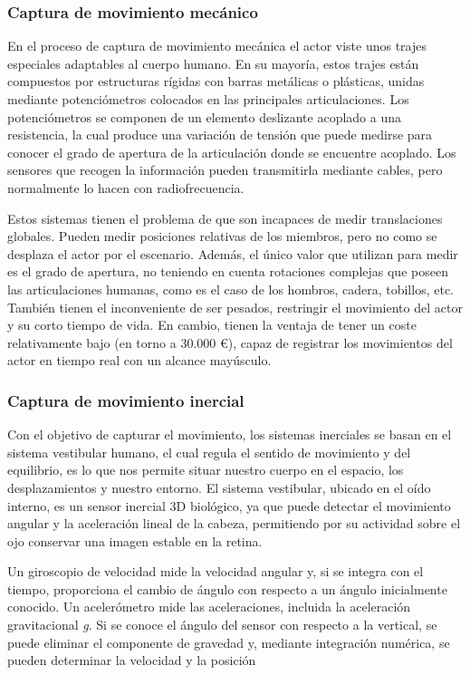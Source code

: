 \subsubsection{Captura de movimiento mecánico}

En el proceso de captura de movimiento mecánica el actor viste unos trajes especiales adaptables al cuerpo humano. En su mayoría, estos trajes están compuestos por estructuras rígidas con barras metálicas o plásticas, unidas mediante potenciómetros colocados en las principales articulaciones. Los potenciómetros se componen de un elemento deslizante acoplado a una resistencia, la cual produce una variación de tensión que puede medirse para conocer el grado de apertura de la articulación donde se encuentre acoplado. Los sensores que recogen la información pueden transmitirla mediante cables, pero normalmente lo hacen con radiofrecuencia.

Estos sistemas tienen el problema de que son incapaces de medir translaciones globales. Pueden medir posiciones relativas de los miembros, pero no como se desplaza el actor por el escenario. Además, el único valor que utilizan para medir es el grado de apertura, no teniendo en cuenta rotaciones complejas que poseen las articulaciones humanas, como es el caso de los hombros, cadera, tobillos, etc. También tienen el inconveniente de ser pesados, restringir el movimiento del actor y su corto tiempo de vida. En cambio, tienen la ventaja de tener un coste relativamente bajo (en torno a 30.000 \euro), capaz de registrar los movimientos del actor en tiempo real con un alcance mayúsculo. 

\subsubsection{Captura de movimiento inercial}

Con el objetivo de capturar el movimiento, los sistemas inerciales se basan en el sistema vestibular humano, el cual regula el sentido de movimiento y del equilibrio, es lo que nos permite situar nuestro cuerpo en el espacio, los desplazamientos y nuestro entorno. El sistema vestibular, ubicado en el oído interno, es un sensor inercial 3D biológico, ya que puede detectar el movimiento angular y la aceleración lineal de la cabeza, permitiendo por su actividad sobre el ojo conservar una imagen estable en la retina. 

Un giroscopio de velocidad mide la velocidad angular y, si se integra con el tiempo, proporciona el cambio de ángulo con respecto a un ángulo inicialmente conocido. Un acelerómetro mide las aceleraciones, incluida la aceleración gravitacional \textit{g}. Si se conoce el ángulo del sensor con respecto a la vertical, se puede eliminar el componente de gravedad y, mediante integración numérica, se pueden determinar la velocidad y la posición

